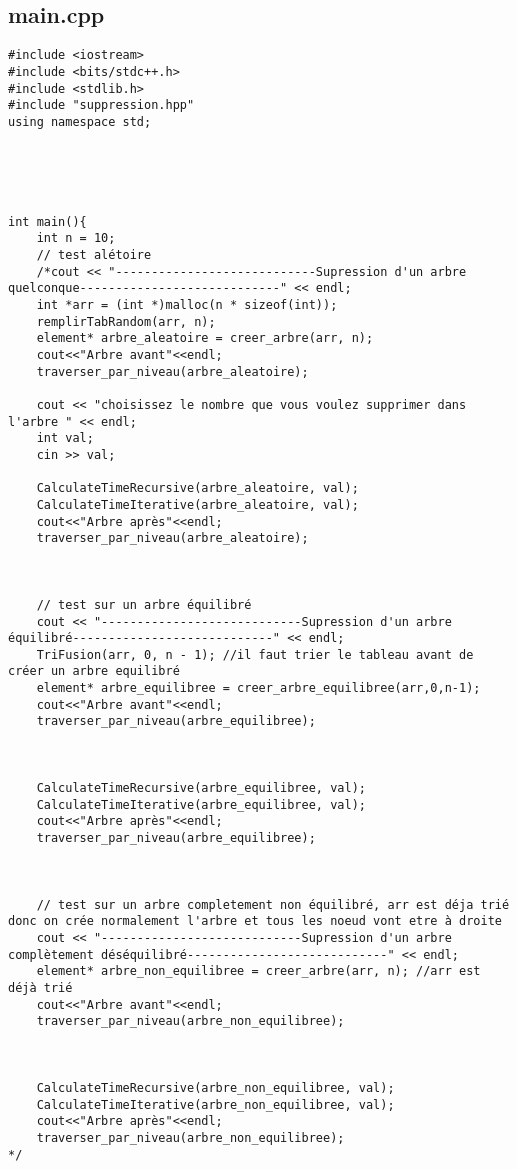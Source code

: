 \subsection{main.cpp}
\begin{verbatim}
#include <iostream> 
#include <bits/stdc++.h>
#include <stdlib.h> 
#include "suppression.hpp"
using namespace std;





int main(){
    int n = 10;
    // test alétoire 
	/*cout << "----------------------------Supression d'un arbre quelconque----------------------------" << endl;
	int *arr = (int *)malloc(n * sizeof(int));
    remplirTabRandom(arr, n);
    element* arbre_aleatoire = creer_arbre(arr, n);
    cout<<"Arbre avant"<<endl;
    traverser_par_niveau(arbre_aleatoire);
	
	cout << "choisissez le nombre que vous voulez supprimer dans l'arbre " << endl;
    int val;
    cin >> val;
	
    CalculateTimeRecursive(arbre_aleatoire, val);
    CalculateTimeIterative(arbre_aleatoire, val);
    cout<<"Arbre après"<<endl;
    traverser_par_niveau(arbre_aleatoire);


	
    // test sur un arbre équilibré
	cout << "----------------------------Supression d'un arbre équilibré----------------------------" << endl;
    TriFusion(arr, 0, n - 1); //il faut trier le tableau avant de créer un arbre equilibré
    element* arbre_equilibree = creer_arbre_equilibree(arr,0,n-1); 
    cout<<"Arbre avant"<<endl;
    traverser_par_niveau(arbre_equilibree);
		

	
    CalculateTimeRecursive(arbre_equilibree, val);
    CalculateTimeIterative(arbre_equilibree, val);
    cout<<"Arbre après"<<endl;
    traverser_par_niveau(arbre_equilibree);


	
    // test sur un arbre completement non équilibré, arr est déja trié donc on crée normalement l'arbre et tous les noeud vont etre à droite
	cout << "----------------------------Supression d'un arbre complètement déséquilibré----------------------------" << endl;
    element* arbre_non_equilibree = creer_arbre(arr, n); //arr est déjà trié
    cout<<"Arbre avant"<<endl;
    traverser_par_niveau(arbre_non_equilibree);
		

	
    CalculateTimeRecursive(arbre_non_equilibree, val);
    CalculateTimeIterative(arbre_non_equilibree, val);
    cout<<"Arbre après"<<endl;
    traverser_par_niveau(arbre_non_equilibree);
*/
	

\end{verbatim}
